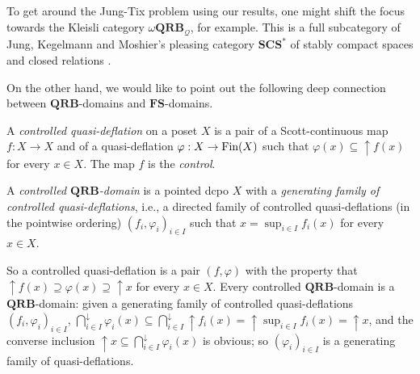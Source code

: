 \documentclass{LMCS}
\newcommand\Smyth{\mathcal Q}
\newcommand\upc{\mathop{\uparrow}\nolimits}
\newcommand\QRB{\mathbf{QRB}}
\newcommand\FS{\mathbf{FS}}
\begin{document}
To get around the Jung-Tix problem using our results, one might shift
the focus towards the Kleisli category $\omega\QRB_{\Smyth}$, for
example.  This is a full subcategory of Jung, Kegelmann and Moshier's
pleasing category $\pmb{SCS}^*$ of stably compact spaces and closed
relations \cite{DBLP:journals/entcs/JungKM01}.

On the other hand, we would like to point out the following deep
connection between $\QRB$-domains and $\FS$-domains.
\begin{defi}
  \label{defi:ctrlQRB}
  A {\em controlled quasi-deflation\/} on a poset $X$ is a pair of a
  Scott-continuous map $f : X \to X$ and of a quasi-deflation $\varphi
  : X \to \mathop{\text{Fin}} (X)$ such that $\varphi (x) \subseteq \upc f (x)$ for
  every $x \in X$.  The map $f$ is the {\em control\/}.

  A {\em controlled $\QRB$-domain\/} is a pointed dcpo $X$ with a {\em
    generating family of controlled quasi-deflations\/}, i.e., a
  directed family of controlled quasi-deflations (in the pointwise
  ordering) ${(f_i, \varphi_i)}_{i \in I}$ such that $x = \sup_{i \in
    I} f_i (x)$ for every $x \in X$.
\end{defi}
So a controlled quasi-deflation is a pair $(f, \varphi)$ with the
property that $\upc f (x) \supseteq \varphi (x) \supseteq \upc x$ for
every $x \in X$.  Every controlled $\QRB$-domain is a $\QRB$-domain:
given a generating family of controlled quasi-deflations ${(f_i,
  \varphi_i)}_{i \in I}$, $\bigcap_{i \in I}^\downarrow {\varphi_i (x)}
\subseteq \bigcap_{i \in I}^\downarrow \upc f_i (x) = \upc \sup_{i \in
  I} f_i (x) = \upc x$, and the converse inclusion $\upc x \subseteq
\bigcap_{i \in I}^\downarrow {\varphi_i (x)}$ is obvious; so
${(\varphi_i)}_{i \in I}$ is a generating family of quasi-deflations.
\end{document}
